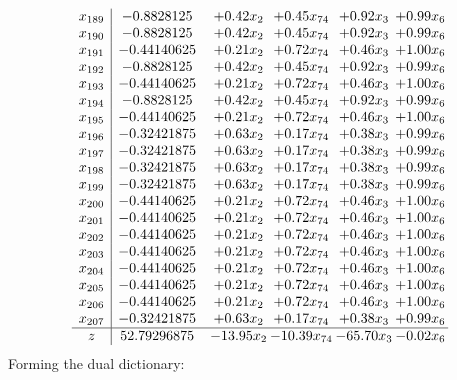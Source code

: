 \documentclass[8pt]{article}
\begin{document}
\[\begin{array}{c| c c@{\hskip 2pt} c@{\hskip 2pt} c@{\hskip 2pt} c@{\hskip 2pt} }
 x_{189}   &  -0.8828125 & +  0.42 x_{2} & +  0.45 x_{74} & +  0.92 x_{3} & +  0.99 x_{6}\\
 x_{190}   &  -0.8828125 & +  0.42 x_{2} & +  0.45 x_{74} & +  0.92 x_{3} & +  0.99 x_{6}\\
 x_{191}   &  -0.44140625 & +  0.21 x_{2} & +  0.72 x_{74} & +  0.46 x_{3} & +  1.00 x_{6}\\
 x_{192}   &  -0.8828125 & +  0.42 x_{2} & +  0.45 x_{74} & +  0.92 x_{3} & +  0.99 x_{6}\\
 x_{193}   &  -0.44140625 & +  0.21 x_{2} & +  0.72 x_{74} & +  0.46 x_{3} & +  1.00 x_{6}\\
 x_{194}   &  -0.8828125 & +  0.42 x_{2} & +  0.45 x_{74} & +  0.92 x_{3} & +  0.99 x_{6}\\
 x_{195}   &  -0.44140625 & +  0.21 x_{2} & +  0.72 x_{74} & +  0.46 x_{3} & +  1.00 x_{6}\\
 x_{196}   &  -0.32421875 & +  0.63 x_{2} & +  0.17 x_{74} & +  0.38 x_{3} & +  0.99 x_{6}\\
 x_{197}   &  -0.32421875 & +  0.63 x_{2} & +  0.17 x_{74} & +  0.38 x_{3} & +  0.99 x_{6}\\
 x_{198}   &  -0.32421875 & +  0.63 x_{2} & +  0.17 x_{74} & +  0.38 x_{3} & +  0.99 x_{6}\\
 x_{199}   &  -0.32421875 & +  0.63 x_{2} & +  0.17 x_{74} & +  0.38 x_{3} & +  0.99 x_{6}\\
 x_{200}   &  -0.44140625 & +  0.21 x_{2} & +  0.72 x_{74} & +  0.46 x_{3} & +  1.00 x_{6}\\
 x_{201}   &  -0.44140625 & +  0.21 x_{2} & +  0.72 x_{74} & +  0.46 x_{3} & +  1.00 x_{6}\\
 x_{202}   &  -0.44140625 & +  0.21 x_{2} & +  0.72 x_{74} & +  0.46 x_{3} & +  1.00 x_{6}\\
 x_{203}   &  -0.44140625 & +  0.21 x_{2} & +  0.72 x_{74} & +  0.46 x_{3} & +  1.00 x_{6}\\
 x_{204}   &  -0.44140625 & +  0.21 x_{2} & +  0.72 x_{74} & +  0.46 x_{3} & +  1.00 x_{6}\\
 x_{205}   &  -0.44140625 & +  0.21 x_{2} & +  0.72 x_{74} & +  0.46 x_{3} & +  1.00 x_{6}\\
 x_{206}   &  -0.44140625 & +  0.21 x_{2} & +  0.72 x_{74} & +  0.46 x_{3} & +  1.00 x_{6}\\
 x_{207}   &  -0.32421875 & +  0.63 x_{2} & +  0.17 x_{74} & +  0.38 x_{3} & +  0.99 x_{6}\\
\hline
z    &  52.79296875 & -13.95 x_{2} & -10.39 x_{74} & -65.70 x_{3} & -0.02 x_{6}\\
\end{array}\]
Forming the dual dictionary:
\end{document}

